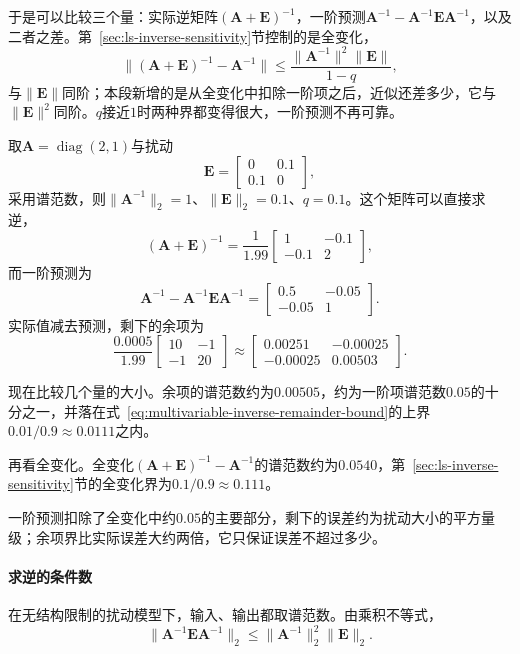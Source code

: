 于是可以比较三个量：实际逆矩阵$(\bm A+\bm E)^{-1}$，一阶预测$\bm A^{-1}-\bm A^{-1}\bm E\bm A^{-1}$，以及二者之差。第~\ref{sec:ls-inverse-sensitivity}节控制的是全变化，
\[
 \lVert(\bm A+\bm E)^{-1}-\bm A^{-1}\rVert\leq\frac{\lVert\bm A^{-1}\rVert^2\lVert\bm E\rVert}{1-q},
\]
与$\lVert\bm E\rVert$同阶；本段新增的是从全变化中扣除一阶项之后，近似还差多少，它与$\lVert\bm E\rVert^2$同阶。$q$接近$1$时两种界都变得很大，一阶预测不再可靠。
\begin{example}[逆矩阵的一阶预测与余项]
\label{ex:multivariable-inverse-first-order-check}
取$\bm A=\operatorname{diag}(2,1)$与扰动
\[
 \bm E=\begin{bmatrix}0&0.1\\0.1&0\end{bmatrix},
\]
采用谱范数，则$\lVert\bm A^{-1}\rVert_2=1$、$\lVert\bm E\rVert_2=0.1$、$q=0.1$。这个矩阵可以直接求逆，
\[
 (\bm A+\bm E)^{-1}=\frac1{1.99}\begin{bmatrix}1&-0.1\\-0.1&2\end{bmatrix},
\]
而一阶预测为
\[
 \bm A^{-1}-\bm A^{-1}\bm E\bm A^{-1}=\begin{bmatrix}0.5&-0.05\\-0.05&1\end{bmatrix}.
\]
实际值减去预测，剩下的余项为
\[
 \frac{0.0005}{1.99}\begin{bmatrix}10&-1\\-1&20\end{bmatrix}\approx\begin{bmatrix}0.00251&-0.00025\\-0.00025&0.00503\end{bmatrix}.
\]

现在比较几个量的大小。余项的谱范数约为$0.00505$，约为一阶项谱范数$0.05$的十分之一，并落在式~\eqref{eq:multivariable-inverse-remainder-bound}的上界$0.01/0.9\approx0.0111$之内。

再看全变化。全变化$(\bm A+\bm E)^{-1}-\bm A^{-1}$的谱范数约为$0.0540$，第~\ref{sec:ls-inverse-sensitivity}节的全变化界为$0.1/0.9\approx0.111$。
\end{example}
一阶预测扣除了全变化中约$0.05$的主要部分，剩下的误差约为扰动大小的平方量级；余项界比实际误差大约两倍，它只保证误差不超过多少。

\paragraph{求逆的条件数}
在无结构限制的扰动模型下，输入、输出都取谱范数。由乘积不等式，
\[
 \lVert\bm A^{-1}\bm E\bm A^{-1}\rVert_2\leq\lVert\bm A^{-1}\rVert_2^2\lVert\bm E\rVert_2 .
\]

